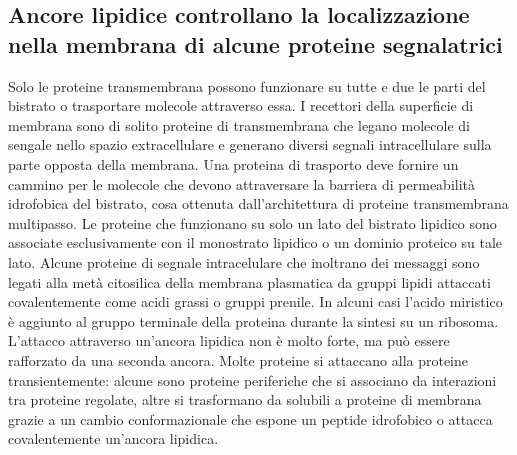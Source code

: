 \subsection{Ancore lipidice controllano la localizzazione nella membrana di alcune proteine segnalatrici}
Solo le proteine transmembrana possono funzionare su tutte e due le parti del bistrato o trasportare molecole attraverso essa. I recettori della superficie di membrana sono di solito
proteine di transmembrana che legano molecole di sengale nello spazio extracellulare e generano diversi segnali intracellulare sulla parte opposta della membrana. Una proteina di
trasporto deve fornire un cammino per le molecole che devono attraversare la barriera di permeabilit\`a idrofobica del bistrato, cosa ottenuta dall'architettura di proteine transmembrana
multipasso. Le proteine che funzionano su solo un lato del bistrato lipidico sono associate esclusivamente con il monostrato lipidico o un dominio proteico su tale lato. Alcune proteine
di segnale intracelulare che inoltrano dei messaggi sono legati alla met\`a citosilica della membrana plasmatica da gruppi lipidi attaccati covalentemente come acidi grassi o gruppi 
prenile. In alcuni casi l'acido miristico \`e aggiunto al gruppo  terminale della proteina durante la sintesi su un ribosoma. L'attacco attraverso un'ancora lipidica non \`e molto
forte, ma pu\`o essere rafforzato da una seconda ancora. Molte proteine si attaccano alla proteine transientemente: alcune sono proteine periferiche che si associano da interazioni
tra proteine regolate, altre si trasformano da solubili a proteine di membrana grazie a un cambio conformazionale che espone un peptide idrofobico o attacca covalentemente un'ancora 
lipidica.
